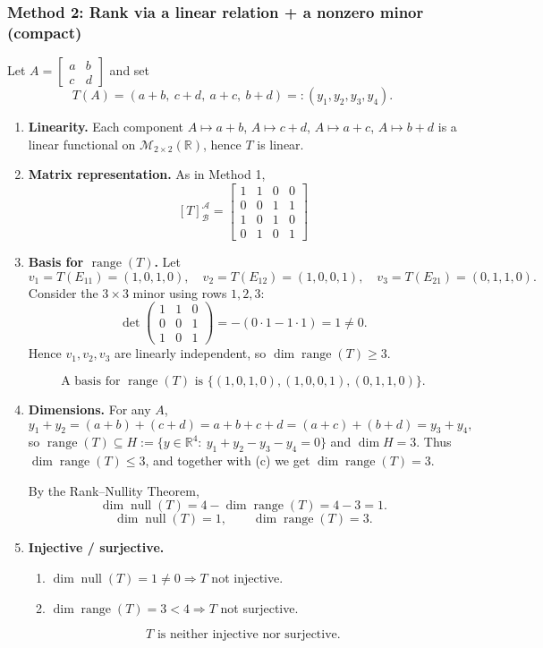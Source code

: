 \documentclass[12pt]{article}
\begin{document}
\subsubsection{Method 2: Rank via a linear relation + a nonzero minor (compact)}
Let $A=\begin{bmatrix}a&b\\c&d\end{bmatrix}$ and set
\[
T(A)=(a+b,\ c+d,\ a+c,\ b+d)=:(y_1,y_2,y_3,y_4).
\]

\begin{enumerate}[label=(\alph*)]
\item \textbf{Linearity.}
Each component $A\mapsto a+b$, $A\mapsto c+d$, $A\mapsto a+c$, $A\mapsto b+d$ is a linear functional on $\mathcal{M}_{2\times 2}(\mathbb{R})$, hence $T$ is linear.

\item \textbf{Matrix representation.}
As in Method 1,
\[
\boxed{\, [T]_{\mathcal{B}}^{\mathcal{A}}=
\begin{bmatrix}
1&1&0&0\\
0&0&1&1\\
1&0&1&0\\
0&1&0&1
\end{bmatrix}\,}
\]

\item \textbf{Basis for $\operatorname{range}(T)$.}
Let
\[
v_1=T(E_{11})=(1,0,1,0),\quad v_2=T(E_{12})=(1,0,0,1),\quad v_3=T(E_{21})=(0,1,1,0).
\]
Consider the $3\times 3$ minor using rows $1,2,3$:
\[
\det\!\begin{pmatrix}
1&1&0\\
0&0&1\\
1&0&1
\end{pmatrix}
=-(0\cdot 1-1\cdot 1)=1\neq 0.
\]
Hence $v_1,v_2,v_3$ are linearly independent, so $\dim\operatorname{range}(T)\ge 3$.

\[
\boxed{\,\text{A basis for }\operatorname{range}(T)\text{ is }\{(1,0,1,0),(1,0,0,1),(0,1,1,0)\}.\,}
\]

\item \textbf{Dimensions.}
For any $A$,
\[
y_1+y_2=(a+b)+(c+d)=a+b+c+d=(a+c)+(b+d)=y_3+y_4,
\]
so $\operatorname{range}(T)\subseteq H:=\{y\in\mathbb{R}^4:\ y_1+y_2-y_3-y_4=0\}$ and $\dim H=3$. Thus $\dim\operatorname{range}(T)\le 3$, and together with (c) we get $\dim\operatorname{range}(T)=3$.

By the Rank--Nullity Theorem,
\[
\dim\operatorname{null}(T)=4-\dim\operatorname{range}(T)=4-3=1.
\]
\[
\boxed{\,\dim\operatorname{null}(T)=1,\qquad \dim\operatorname{range}(T)=3.\,}
\]

\item \textbf{Injective / surjective.}
\begin{enumerate}[label=(\roman*)]
\item $\dim\operatorname{null}(T)=1\neq 0\Rightarrow T$ not injective.
\item $\dim\operatorname{range}(T)=3<4\Rightarrow T$ not surjective.
\end{enumerate}
\[
\boxed{\,T\text{ is neither injective nor surjective.}\,}
\]
\end{enumerate}
\end{document}
